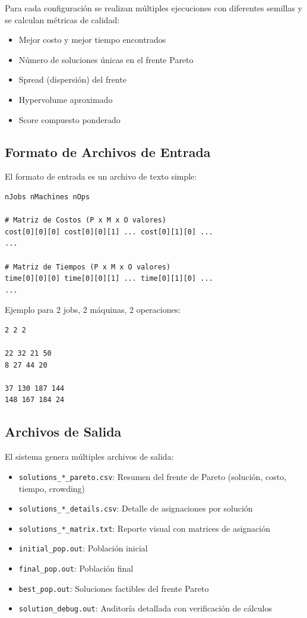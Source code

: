\documentclass[preprint,12pt,authoryear]{elsarticle}
\begin{document}
Para cada configuración se realizan múltiples ejecuciones con diferentes semillas y se calculan métricas de calidad:

\begin{itemize}
    \item Mejor costo y mejor tiempo encontrados
    \item Número de soluciones únicas en el frente Pareto
    \item Spread (dispersión) del frente
    \item Hypervolume aproximado
    \item Score compuesto ponderado
\end{itemize}

\subsection{Formato de Archivos de Entrada}

El formato de entrada es un archivo de texto simple:

\begin{lstlisting}[caption=Formato de archivo de instancia]
nJobs nMachines nOps

# Matriz de Costos (P x M x O valores)
cost[0][0][0] cost[0][0][1] ... cost[0][1][0] ...
...

# Matriz de Tiempos (P x M x O valores)
time[0][0][0] time[0][0][1] ... time[0][1][0] ...
...
\end{lstlisting}

Ejemplo para 2 jobs, 2 máquinas, 2 operaciones:
\begin{lstlisting}
2 2 2

22 32 21 50 
8 27 44 20 

37 130 187 144 
148 167 184 24 
\end{lstlisting}

\subsection{Archivos de Salida}

El sistema genera múltiples archivos de salida:

\begin{itemize}
    \item \texttt{solutions\_*\_pareto.csv}: Resumen del frente de Pareto (solución, costo, tiempo, crowding)
    \item \texttt{solutions\_*\_details.csv}: Detalle de asignaciones por solución
    \item \texttt{solutions\_*\_matrix.txt}: Reporte visual con matrices de asignación
    \item \texttt{initial\_pop.out}: Población inicial
    \item \texttt{final\_pop.out}: Población final
    \item \texttt{best\_pop.out}: Soluciones factibles del frente Pareto
    \item \texttt{solution\_debug.out}: Auditoría detallada con verificación de cálculos
\end{itemize}
\end{document}
